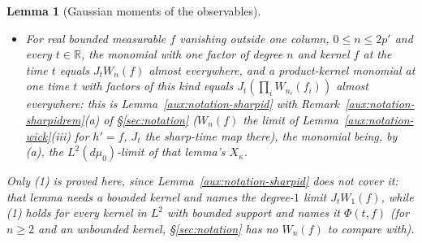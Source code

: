 \documentclass[11pt,a4paper]{article}
\theoremstyle{plain}
\theoremstyle{definition}
\theoremstyle{plain}
\newtheorem{auxlemma}{Lemma}
\theoremstyle{definition}
\newcommand{\R}{\mathbb{R}}
\newcommand{\dmu}{d\mu_0}
\begin{document}
\begin{auxlemma}[Gaussian moments of the observables]
\begin{itemize}
\begin{itemize}
Definition~\ref{aux:d1-obs}(b) with one factor of degree $1$ and kernel $f$ at the time $t$ is
$\Phi(t,f)$.
\item[(2)] For real bounded measurable $f$ vanishing outside one column, $0\le n\le2p'$ and every
$t\in\R$, the monomial with one factor of degree $n$ and kernel $f$ at the time $t$ equals
$J_tW_n(f)$ almost everywhere, and a product-kernel monomial at one time $t$ with factors of
this kind equals $J_t(\prod_iW_{n_i}(f_i))$ almost everywhere: this is
Lemma~\ref{aux:notation-sharpid} with Remark~\ref{aux:notation-sharpidrem}(a) of
\S\ref{sec:notation} ($W_n(f)$ the limit of Lemma~\ref{aux:notation-wick}(iii) for $h'=f$, $J_t$
the sharp-time map there), the monomial being, by (a), the $L^2(\dmu)$-limit of that lemma's
$X_\kappa$.
\end{itemize}
Only (1) is proved here, since Lemma~\ref{aux:notation-sharpid} does not cover it: that lemma
needs a bounded kernel and names the degree-$1$ limit $J_tW_1(f)$, while (1) holds for every
kernel in $L^2$ with bounded support and names it $\Phi(t,f)$ (for $n\ge2$ and an unbounded
kernel, \S\ref{sec:notation} has no $W_n(f)$ to compare with).
\end{itemize}
\end{auxlemma}
\end{document}

